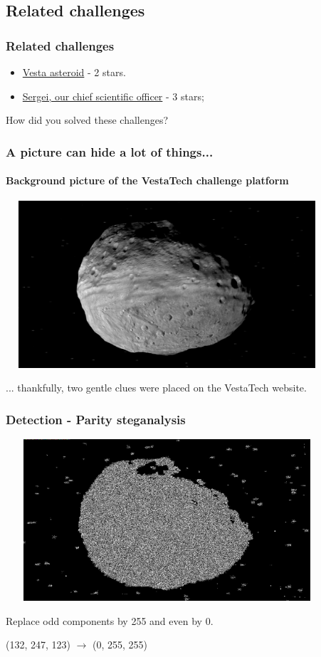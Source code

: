 \documentclass[]{beamer}
\begin{document}
\subsection{Related challenges}
\begin{frame}
\frametitle{Related challenges}
\begin{itemize}
    \item \href{https://github.com/cscluxembourg/vestatech/blob/master/challenges/Vesta-asteroid/vesta.png}{Vesta asteroid} - 2 stars.
    \item \href{https://github.com/cscluxembourg/vestatech/blob/master/challenges/sergei/Sergei.png}{Sergei, our chief scientific officer} - 3 stars;
\end{itemize}
\bigskip
How did you solved these challenges?
\end{frame}

\begin{frame}
\frametitle{A picture can hide a lot of things...}
\framesubtitle{Background picture of the VestaTech challenge platform}
\begin{center}
    \includegraphics[height=6.2cm, width=12.0cm]{./images/vesta.png}
\end{center}
... thankfully, two gentle clues were placed on the VestaTech website.
\end{frame}

\begin{frame}
\frametitle{Detection - Parity steganalysis}
\begin{center}
    \includegraphics[height=6.0cm, width=12.0cm]{./images/vesta_steg.png}
\end{center}
Replace odd components by 255 and even by 0.

(132, 247, 123) $\longrightarrow$ (0, 255, 255)
\end{frame}
\end{document}

